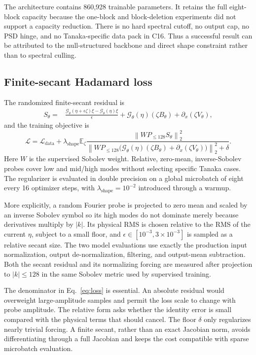 \documentclass[11pt]{article}
\newcommand{\Gt}{\mathcal{G}_{\theta}}
\newcommand{\norm}[1]{\left\lVert #1\right\rVert}
\begin{document}
The architecture contains 860,928 trainable parameters.  It retains the full
eight-block capacity because the one-block and block-deletion experiments did
not support a capacity reduction.  There is no hard spectral cutoff, no output
cap, no PSD hinge, and no Tanaka-specific data pack in C16.  Thus a successful
result can be attributed to the null-structured backbone and direct shape
constraint rather than to spectral culling.

\subsection{Finite-secant Hadamard loss}

The randomized finite-secant residual is
\begin{align}
 S_\theta={}&
 \frac{\Gt(\eta+\epsilon\zeta)\xi-\Gt(\eta)\xi}{\epsilon}
 +\Gt(\eta)(\zeta B_\theta)
 +\partial_x(\zeta V_\theta),
\end{align}
and the training objective is
\begin{equation}
 \mathcal{L}
 =\mathcal{L}_{\mathrm{data}}
 +\lambda_{\mathrm{shape}}
 \mathbb{E}_{\zeta}
 \frac{\norm{W P_{\leq128}S_\theta}_2^2}
 {\norm{W P_{\leq128}\bigl(
     \Gt(\eta)(\zeta B_\theta)+\partial_x(\zeta V_\theta)
   \bigr)}_2^2+\delta}.
 \label{eq:loss}
\end{equation}
Here \(W\) is the supervised Sobolev weight.  Relative, zero-mean,
inverse-Sobolev probes cover low and mid/high modes without selecting specific
Tanaka cases.  The regularizer is evaluated in double precision on a global
microbatch of eight every 16 optimizer steps, with
\(\lambda_{\mathrm{shape}}=10^{-2}\) introduced through a warmup.

More explicitly, a random Fourier probe is projected to zero mean and scaled
by an inverse Sobolev symbol so its high modes do not dominate merely because
derivatives multiply by \(|k|\).  Its physical RMS is chosen relative to the
RMS of the current \(\eta\), subject to a small floor, and
\(\epsilon\in[10^{-3},3\times10^{-3}]\) is sampled as a relative secant size.
The two model evaluations use exactly the production input normalization,
output de-normalization, filtering, and output-mean subtraction.  Both the
secant residual and its normalizing forcing are measured after projection to
\(|k|\leq128\) in the same Sobolev metric used by supervised training.

The denominator in Eq.~\eqref{eq:loss} is essential.  An absolute residual
would overweight large-amplitude samples and permit the loss scale to change
with probe amplitude.  The relative form asks whether the identity error is
small compared with the physical terms that should cancel.  The floor
\(\delta\) only regularizes nearly trivial forcing.  A finite secant, rather
than an exact Jacobian norm, avoids differentiating through a full Jacobian and
keeps the cost compatible with sparse microbatch evaluation.
\end{document}
